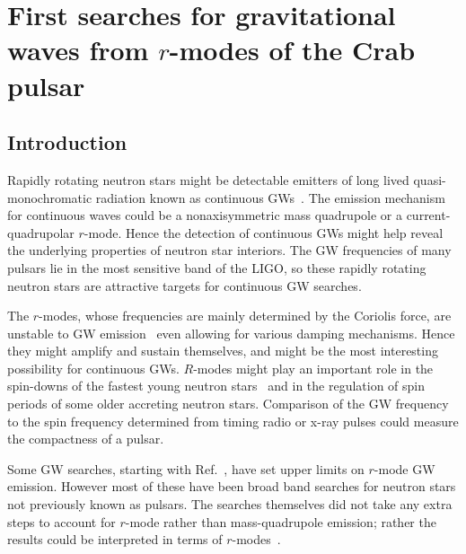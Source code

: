\documentclass{ttuthes2007}
\begin{document}
\chapter{\textbf{First searches for gravitational waves from $r$-modes of the
Crab pulsar}}

\section{Introduction}

Rapidly rotating neutron stars might be detectable emitters of long lived
quasi-monochromatic radiation known as continuous
\acp{GW}~\cite{Glampedakis2018}. The emission mechanism for continuous waves
could be a nonaxisymmetric mass quadrupole or a current-quadrupolar $r$-mode.
Hence the detection of continuous \acp{GW} might help reveal the underlying
properties of neutron star interiors. The \ac{GW} frequencies of many pulsars
lie in the most sensitive band of the \ac{LIGO}, so these rapidly rotating
neutron stars are attractive targets for continuous \ac{GW} searches.

The $r$-modes, whose frequencies are mainly determined by the Coriolis force,
are unstable to \ac{GW} emission~\cite{Andersson_1998,Friedman_1998} even
allowing for various damping mechanisms. Hence they might amplify and sustain
themselves, and might be the most interesting possibility for continuous
\acp{GW}. $R$-modes might play an important role in the spin-downs of the
fastest young neutron stars~\cite{Owen_1998} and in the regulation of spin
periods of some older accreting neutron stars. Comparison of the \ac{GW}
frequency to the spin frequency determined from timing radio or x-ray pulses
could measure the compactness of a pulsar.

Some \ac{GW} searches, starting with Ref.~\cite{Abadie_2010}, have set upper
limits on $r$-mode \ac{GW} emission.
However most of these have been broad band searches for neutron stars not
previously known as pulsars.
The searches themselves did not take any extra steps to account for $r$-mode
rather than mass-quadrupole emission; rather the results could be interpreted in
terms of $r$-modes~\cite{Owen_2010}.
\end{document}

